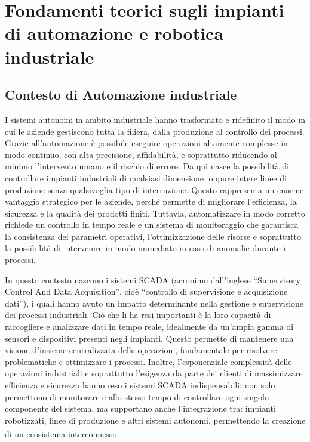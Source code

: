 \chapter{Fondamenti teorici sugli impianti di automazione e robotica industriale}

\section{Contesto di Automazione industriale}
I sistemi autonomi in ambito industriale hanno trasformato e ridefinito il modo in cui le aziende gestiscono tutta la filiera, dalla produzione al controllo dei processi. Grazie all'automazione è possibile eseguire operazioni altamente complesse in modo continuo, con alta precisione, affidabilità, e soprattutto riducendo al minimo l'intervento umano e il rischio di errore. Da qui nasce la possibilità di controllare impianti industriali di qualsiasi dimensione, oppure intere linee di produzione senza qualsivoglia tipo di interruzione. Questo rappresenta un enorme vantaggio strategico per le aziende, perché permette di migliorare l'efficienza, la sicurezza e la qualità dei prodotti finiti. Tuttavia, automatizzare in modo corretto richiede un controllo in tempo reale e un sistema di monitoraggio che garantisca la consistenza dei parametri operativi, l'ottimizzazione delle risorse e soprattutto la possibilità di intervenire in modo immediato in caso di anomalie durante i processi.

In questo contesto nascono i sistemi SCADA (acronimo dall’inglese “Supervisory Control And Data Acquisition”, cioè “controllo di supervisione e acquisizione dati”), i quali hanno avuto un impatto determinante nella gestione e supervisione dei processi industriali. Ciò che li ha resi importanti è la loro capacità di raccogliere e analizzare dati in tempo reale, idealmente da un'ampia gamma di sensori e dispositivi presenti negli impianti. Questo permette di mantenere una visione d'insieme centralizzata delle operazioni, fondamentale per risolvere problematiche e ottimizzare i processi. Inoltre, l'esponenziale complessità delle operazioni industriali e soprattutto l'esigenza da parte dei clienti di massimizzare efficienza e sicurezza hanno reso i sistemi SCADA indispensabili: non solo permettono di monitorare e allo stesso tempo di controllare ogni singolo componente del sistema, ma supportano anche l'integrazione tra: impianti robotizzati, linee di produzione e altri sistemi autonomi, permettendo la creazione di un ecosistema interconnesso.\textsuperscript{\cite{sielcosistemi}} 

